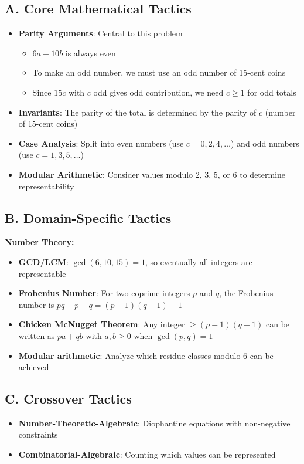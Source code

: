 \documentclass[12pt]{article}
\begin{document}
\begin{tacticalbox}
\subsection*{A. Core Mathematical Tactics}
\begin{itemize}[leftmargin=*]
    \item \textbf{Parity Arguments}: Central to this problem
    \begin{itemize}
        \item $6a + 10b$ is always even
        \item To make an odd number, we must use an odd number of 15-cent coins
        \item Since $15c$ with $c$ odd gives odd contribution, we need $c \geq 1$ for odd totals
    \end{itemize}
    \item \textbf{Invariants}: The parity of the total is determined by the parity of $c$ (number of 15-cent coins)
    \item \textbf{Case Analysis}: Split into even numbers (use $c = 0, 2, 4, \ldots$) and odd numbers (use $c = 1, 3, 5, \ldots$)
    \item \textbf{Modular Arithmetic}: Consider values modulo 2, 3, 5, or 6 to determine representability
\end{itemize}

\subsection*{B. Domain-Specific Tactics}

\textbf{Number Theory:}
\begin{itemize}[leftmargin=*]
    \item \textbf{GCD/LCM}: $\gcd(6, 10, 15) = 1$, so eventually all integers are representable
    \item \textbf{Frobenius Number}: For two coprime integers $p$ and $q$, the Frobenius number is $pq - p - q = (p-1)(q-1) - 1$
    \item \textbf{Chicken McNugget Theorem}: Any integer $\geq (p-1)(q-1)$ can be written as $pa + qb$ with $a, b \geq 0$ when $\gcd(p,q) = 1$
    \item \textbf{Modular arithmetic}: Analyze which residue classes modulo 6 can be achieved
\end{itemize}

\subsection*{C. Crossover Tactics}
\begin{itemize}[leftmargin=*]
    \item \textbf{Number-Theoretic-Algebraic}: Diophantine equations with non-negative constraints
    \item \textbf{Combinatorial-Algebraic}: Counting which values can be represented
\end{itemize}
\end{tacticalbox}
\end{document}
